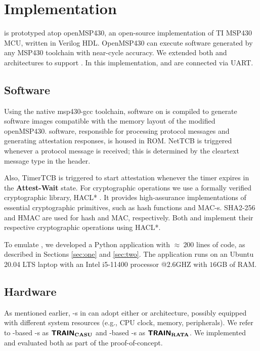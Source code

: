 \section{Implementation \label{impl}}
%
\system is prototyped atop openMSP430\cite{openMSP430}, an open-source implementation of TI MSP430 MCU, 
written in Verilog HDL. OpenMSP430 can execute software generated by any MSP430 toolchain 
\cite{msp430-gcc} with near-cycle accuracy. We extended both \rata and \casu architectures to 
support \system. In this implementation, \prv and \vrf are connected via UART.

\subsection{\system Software}
%
Using the native msp430-gcc toolchain, \system software on \prv is compiled to generate software images 
compatible with the memory layout of the modified openMSP430. \system software, responsible for processing 
\system protocol messages and generating attestation responses, is housed in ROM.
NetTCB is triggered whenever a \system protocol message is received; this is determined by the cleartext 
message type in the header.

Also, TimerTCB is triggered to start attestation whenever the timer expires in the {\bf Attest-Wait} state.
For cryptographic operations we use a formally verified cryptographic library, HACL* \cite{hacl}.
It provides high-assurance implementations of essential cryptographic primitives, such as hash 
functions and MAC-s. SHA2-256 and HMAC are used for hash and MAC, respectively.
Both \rata and \casu implement their respective cryptographic operations using HACL*.


To emulate \vrf, we developed a Python application with $\approx~200$ lines of code, 
as described in Sections \ref{sec:one} and \ref{sec:two}. The application runs on an
Ubuntu 20.04 LTS laptop with an Intel i5-11400 processor @$2.6$GHZ with $16$GB of RAM.

\subsection{\system Hardware}

As mentioned earlier, \prv-s in \system can adopt either \casu or \rata architecture,
possibly equipped with different system resources (e.g., CPU clock, 
memory, peripherals). We refer to \casu-based \prv-s as $\boldsymbol{{\sf{TRAIN_{{\rm CASU}}}}}$ and 
\rata-based \prv-s as $\boldsymbol{{\sf{TRAIN_{{\rm RATA}}}}}$. We implemented and evaluated both 
as part of the proof-of-concept.

